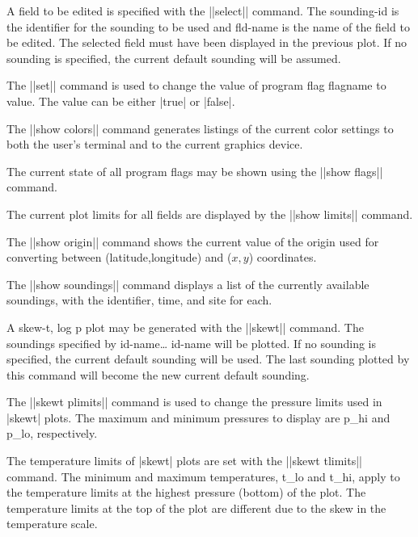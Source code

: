 \begin{glossarylist}
	A field to be edited is specified with the ||select|| command.  The
	{\pf sounding-id} is the identifier for the sounding to be used
	and {\pf fld-name} is the name of the field to be edited.  The
	selected field must have been displayed in the previous plot.
	If no sounding is specified, the current default sounding will be
	assumed.

	The ||set|| command is used to change the value of program flag
	{\pf flagname} to {\pf value}.  The {\pf value} can be either
	|true| or |false|.

	The ||show colors|| command generates listings of the current color
	settings to both the user's terminal and to the current graphics
	device.

	The current state of all program flags may be shown using the
	||show flags|| command.

	The current plot limits for all fields are displayed by the 
	||show limits|| command.

	The ||show origin|| command shows the current value of the origin
	used for converting between (latitude,longitude) and
	($x,y$) coordinates.

	The ||show soundings|| command displays a list of the currently
	available soundings, with the identifier, time, and site for each.

	A skew-t, log p plot may be generated with the ||skewt|| command.
	The soundings specified by {\pf id-name}\ldots
	{\pf id-name} will be plotted.  If no sounding is specified,
	the current default sounding will be used.  The last sounding plotted
	by this command will become the new current default sounding.

	The ||skewt plimits|| command is used to change the pressure limits
	used in |skewt| plots.  The maximum and minimum pressures to display
	are {\pf p\_hi} and {\pf p\_lo}, respectively.

	The temperature limits of |skewt| plots are set with the 
	||skewt tlimits|| command.  The minimum and maximum temperatures,
	{\pf t\_lo} and {\pf t\_hi}, apply to the temperature limits at
	the highest pressure (bottom) of the plot.  The temperature
	limits at the top of the plot are different due to the skew in the
	temperature scale.


\end{glossarylist}
